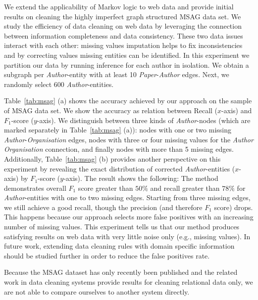 We extend the applicability of Markov logic to web data and provide initial results on cleaning the highly imperfect graph structured \textsc{MSAG} data set. We study the efficiency of data cleaning on web data by leveraging the connection between information completeness and data consistency. These two data issues interact with each other: missing values imputation helps to fix inconsistencies and by correcting values missing entities can be identified. %
In this experiment we partition our data by running inference for each author in isolation. We obtain a subgraph per \textit{Author}-entity with at least 10 \textit{Paper}-\textit{Author} edges. Next, we randomly select 600 \textit{Author}-entities. 

Table~\ref{tab:msag} (a) shows the accuracy achieved by our approach on the sample of \textsc{MSAG} data set. We show the accuracy as relation between Recall ($x$-axis) and $F_1$-score ($y$-axis). We distinguish between three kinds of \textit{Author}-nodes (which are marked separately in Table~\ref{tab:msag} (a)): 
nodes with one or two missing \textit{Author}-\textit{Organisation} edges, nodes with three or four missing values for the \textit{Author} \textit{Organisation} connection, and finally nodes with more than 5 missing edges. Additionally, Table~\ref{tab:msag} (b) provides another perspective on this experiment by revealing the exact distribution of corrected \textit{Author}-entities ($x$-axis) by $F_1$-score ($y$-axis). The result shows the following: The method demonstrates overall $F_1$ score greater than $50\%$ and recall greater than $78\%$ for \textit{Author}-entities with one to two missing edges. Starting from three missing edges, we still achieve a good recall, though the precision (and therefore $F_1$ score) drops. This happens because our approach selects more false positives with an increasing number of missing values. This experiment tells us that our method produces satisfying results on web data with very little noise only (e.g., missing values). In future work, extending data cleaning rules with domain specific information should be studied further in order to reduce the false positives rate. 

Because the \textsc{MSAG} dataset has only recently been published and the related work in data cleaning systems provide results for cleaning relational data only, we are not able to compare ourselves to another system directly.

